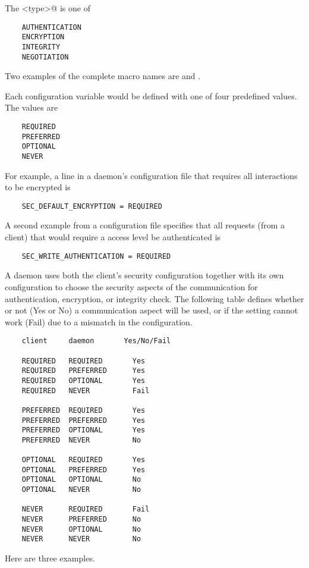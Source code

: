 The \verb@<type>@ is one of
\begin{verbatim}
    AUTHENTICATION
    ENCRYPTION
    INTEGRITY
    NEGOTIATION
\end{verbatim}
Two examples of the complete macro names are
and
.

Each configuration variable would be defined with one
of four predefined values.
The values are
\begin{verbatim}
    REQUIRED
    PREFERRED
    OPTIONAL
    NEVER 
\end{verbatim}
For example, a line in a daemon's configuration file
that requires all interactions to be encrypted is
\begin{verbatim}
    SEC_DEFAULT_ENCRYPTION = REQUIRED
\end{verbatim}
A second example from a configuration file specifies that all
requests (from a client) that would require a 
access level be authenticated is
\begin{verbatim}
    SEC_WRITE_AUTHENTICATION = REQUIRED
\end{verbatim}

A daemon uses both the client's security configuration
together with its own configuration to choose the security
aspects of the communication
for authentication, encryption, or integrity check.
The following table defines whether or not (Yes or No) a
communication aspect will be used, or if the setting cannot
work (Fail) due to a mismatch in the configuration.

\begin{verbatim}
    client     daemon       Yes/No/Fail

    REQUIRED   REQUIRED       Yes
    REQUIRED   PREFERRED      Yes
    REQUIRED   OPTIONAL       Yes
    REQUIRED   NEVER          Fail

    PREFERRED  REQUIRED       Yes
    PREFERRED  PREFERRED      Yes
    PREFERRED  OPTIONAL       Yes
    PREFERRED  NEVER          No

    OPTIONAL   REQUIRED       Yes
    OPTIONAL   PREFERRED      Yes
    OPTIONAL   OPTIONAL       No
    OPTIONAL   NEVER          No

    NEVER      REQUIRED       Fail
    NEVER      PREFERRED      No
    NEVER      OPTIONAL       No
    NEVER      NEVER          No
\end{verbatim}

Here are three examples.

